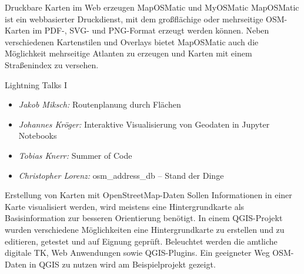 %
{Druckbare Karten im Web erzeugen}%
{MapOSMatic und MyOSMatic}%
{%
  MapOSMatic ist ein webbasierter Druckdienst, mit dem großflächige oder mehrseitige OSM-Karten im
  PDF-, SVG- und PNG-Format erzeugt werden können. Neben verschiedenen Kartenstilen und Overlays
  bietet MapOSMatic auch die Möglichkeit mehrseitige Atlanten zu erzeugen und Karten mit einem
  Straßenindex zu versehen.
}

\abstractNeun{}%
{Lightning Talks I}%
{}%
{%
  \vspace{-2em}
  \begin{itemize}
    \RaggedRight
    \setlength{\itemsep}{-0.25\baselineskip} %
    \item \emph{Jakob Miksch:} Routenplanung durch Flächen
    \item \emph{Johannes Kröger:} Interaktive Visualisierung von Geodaten in Jupyter Notebooks
    \item \emph{Tobias Knerr:} Summer of Code
    \item \emph{Christopher Lorenz:} osm\_address\_db -- Stand der Dinge
  \end{itemize}
  \justifying
}
\vspace{-1.5em}

%
{Erstellung von Karten mit OpenStreetMap-Daten}%
{}%
{Sollen Informationen in einer Karte visualisiert werden, wird meistens eine
Hintergrundkarte als Basisinformation zur besseren Orientierung benötigt. In
einem QGIS-Projekt wurden verschiedene Möglichkeiten eine Hintergrundkarte zu
erstellen und zu editieren, getestet und auf Eignung geprüft. Beleuchtet werden
die amtliche digitale TK, Web Anwendungen sowie QGIS-Plugins. Ein geeigneter
Weg OSM-Daten in QGIS zu nutzen wird am Beispielprojekt gezeigt.}
\vspace{-0.5em}


